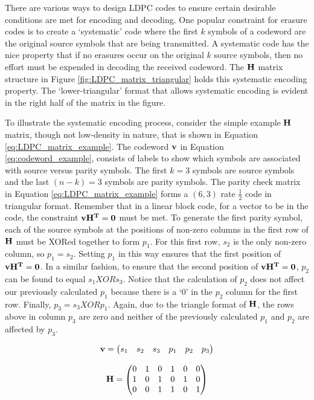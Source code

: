 \documentclass[conference]{IEEEtran}
\begin{document}
There are various ways to design LDPC codes to ensure certain desirable conditions are met for encoding and decoding.  One popular constraint for erasure codes is to create a ‘systematic’ code where the first $k$ symbols of a codeword are the original source symbols that are being transmitted.  A systematic code has the nice property that if no erasures occur on the original $k$ source symbols, then no effort must be expended in decoding the received codeword.  The $\bf{H}$ matrix structure in Figure \ref{fig:LDPC_matrix_triangular} holds this systematic encoding property.  The ‘lower-triangular’ format that allows systematic encoding is evident in the right half of the matrix in the figure.  

To illustrate the systematic encoding process, consider the simple example $\bf{H}$ matrix, though not low-density in nature, that is shown in Equation \ref{eq:LDPC_matrix_example}.  The codeword $\bf{v}$ in Equation \ref{eq:codeword_example}, consists of labels to show which symbols are associated with source versus parity symbols.  The first $k=3$ symbols are source symbols and the last $(n-k)=3$ symbols are parity symbols.  The parity check matrix in Equation \ref{eq:LDPC_matrix_example} forms a $(6, 3)$ rate $\frac{1}{2}$ code in triangular format.  Remember that in a linear block code, for a vector to be in the code, the constraint $\bf{v}\bf{H}^T=\bf{0}$ must be met.  To generate the first parity symbol, each of the source symbols at the positions of non-zero columns in the first row of $\bf{H}$ must be XORed together to form $p_1$.  For this first row, $s_2$ is the only non-zero column, so $p_1 = s_2$.  Setting $p_1$ in this way ensures that the first position of $\bf{v}\bf{H}^T = 0$.  In a similar fashion, to ensure that the second position of $\bf{v}\bf{H}^T = 0$, $p_2$ can be found to equal $s_1 XOR s_3$.  Notice that the calculation of $p_2$ does not affect our previously calculated $p_1$ because there is a ‘0’ in the $p_2$ column for the first row.   Finally, $p_3 = s_3 XOR p_1$.  Again, due to the triangle format of $\bf{H}$, the rows above in column $p_3$ are zero and neither of the previously calculated $p_1$ and $p_2$ are affected by $p_3$.

\begin{equation}
	\bf{v} = 
	\begin{pmatrix}
		s_1&s_2&s_3&p_1&p_2&p_3
	\end{pmatrix}
	\label{eq:codeword_example}
\end{equation}


\begin{equation}
	\bf{H} = 
	\begin{pmatrix}
		0&1&0&1&0&0 \\
		1&0&1&0&1&0 \\
		0&0&1&1&0&1
	\end{pmatrix}
\label{eq:LDPC_matrix_example}
\end{equation}
\end{document}
